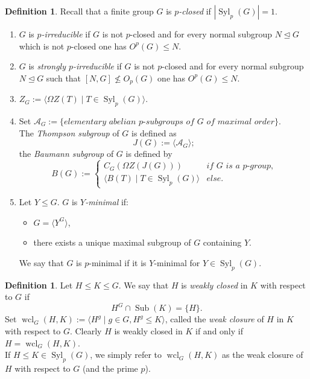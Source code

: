 \documentclass{amsart}
\numberwithin{equation}{section}
\theoremstyle{definition}
\newtheorem{definition}[equation]{Definition}
\theoremstyle{subresult}
\theoremstyle{caseresult}
\newcommand{\A}{\mathcal{A}}
\newcommand{\Syl}{\operatorname{Syl}}
\newcommand{\wcl}{\operatorname{wcl}}
\newcommand{\Sub}{\operatorname{Sub}}
\newcommand{\norm}{\trianglelefteq}
\newcommand{\<}{\langle}
\renewcommand{\>}{\rangle}
\begin{document}
\begin{definition}\label{def: p-irreducible, thompson and baumann subgroups}
    Recall that a finite group $G$ is \emph{$p$-closed} if $|\Syl_p(G)|=1$.
    \begin{enumerate}
        \item $G$ is \emph{$p$-irreducible} if $G$ is not $p$-closed and for every normal subgroup $N \norm G$ which is not $p$-closed one has $O^p(G) \le N$.
        \item $G$ is \emph{strongly $p$-irreducible} if $G$ is not $p$-closed and for every normal subgroup $N \norm G$ such that $[N,G] \not \le O_p(G)$ one has $O^p(G) \le N$.
        \item $Z_G := \< \Omega Z(T) \mid T \in \Syl_p(G) \>$.
        \item Set $\A_G := \{ \textit{elementary abelian $p$-subgroups of $G$ of maximal order} \}$.\\
        The \emph{Thompson subgroup} of $G$ is defined as 
        \[
        J(G) := \< \A_G \>;
        \]
        the \emph{Baumann subgroup} of $G$ is defined by
        \[
        B(G) := \begin{cases}
                    C_G(\Omega Z(J(G)))     & \textit{if $G$ is a $p$-group,} \\
                    \<B(T) \mid T \in \Syl_p(G) \>  & \textit{else.}
                \end{cases}
        \]
        \item Let $Y \le G$. $G$ is \emph{$Y$-minimal} if:
    \begin{itemize}
        \item $G=\< Y^G \>$,
        \item there exists a unique maximal subgroup of $G$ containing $Y$.
    \end{itemize}
        We say that $G$ is $p$-minimal if it is $Y$-minimal for $Y \in \Syl_p(G)$.
    \end{enumerate}
\end{definition}

\vspace{0.4cm}
\begin{definition}
    Let $H \le K \le G$. We say that $H$ is \emph{weakly closed} in $K$ with respect to $G$ if
    \[
    H^G \cap \Sub(K) = \{H\}.
    \]
    Set $ \wcl_G(H,K) := \< H^g \mid g \in G, H^g \le K \>$, called the \emph{weak closure} of $H$ in $K$ with respect to $G$. Clearly $H$ is weakly closed in $K$ if and only if $H=\wcl_G(H,K)$.\\
    If $H \le K \in \Syl_p(G)$, we simply refer to $\wcl_G(H,K)$ as the weak closure of $H$ with respect to $G$ (and the prime $p$).
\end{definition}
\end{document}
